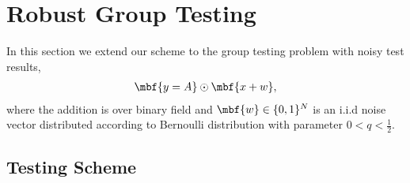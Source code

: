 \documentclass[conference,twocolumn]{IEEEtran}
\begin{document}
\section{Robust Group Testing}
\label{Sec:NoisyGroupTesting}
In this section we extend our scheme to the group testing problem with noisy test results,
\begin{align*}
\mbf{y=A}\odot \mbf{x+w},
\end{align*}
where the addition is over binary field and $\mbf{w}\in\{0,1\}^N$ is an i.i.d noise vector distributed according to Bernoulli distribution with parameter $0<q<\frac{1}{2}$.

\subsection*{Testing Scheme}
\end{document}
